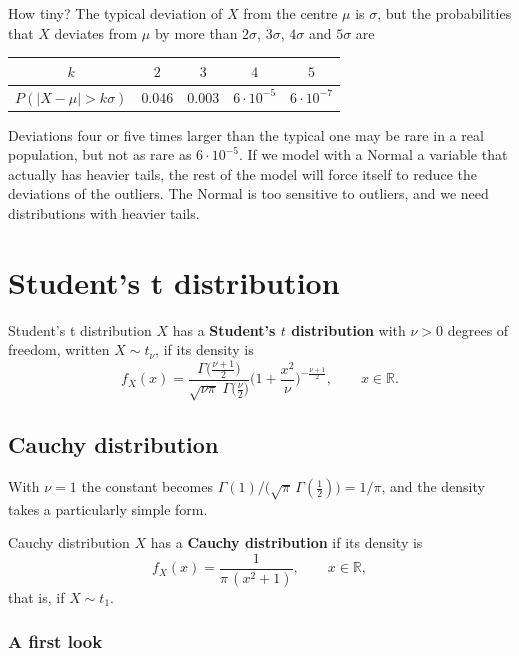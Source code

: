 \documentclass[a4paper,12pt,oneside]{report}
\begin{document}
\begin{studylater}
How tiny? The typical deviation of $X$ from the centre $\mu$ is $\sigma$, but
the probabilities that $X$ deviates from $\mu$ by more than $2\sigma$,
$3\sigma$, $4\sigma$ and $5\sigma$ are
\begin{center}
\begin{tabular}{c|cccc}
$k$ & $2$ & $3$ & $4$ & $5$\\
\hline
$P(|X-\mu|>k\sigma)$ & $0.046$ & $0.003$ & $6\cdot10^{-5}$ & $6\cdot10^{-7}$
\end{tabular}
\end{center}
Deviations four or five times larger than the typical one may be rare in a
real population, but not as rare as $6\cdot10^{-5}$. If we model with a
Normal a variable that actually has heavier tails, the rest of the model
will force itself to reduce the deviations of the outliers. The Normal is
too sensitive to outliers, and we need distributions with heavier tails.
\end{studylater}

\section{Student's t distribution}

\begin{frameddefn}{Student's t distribution}\label{def:student-t}
$X$ has a \textbf{Student's $t$ distribution} with $\nu>0$ degrees of
freedom, written $X\sim t_\nu$, if its density is
\[
f_X(x)=\frac{\Gamma\!\big(\frac{\nu+1}{2}\big)}
{\sqrt{\nu\pi}\;\Gamma\!\big(\frac{\nu}{2}\big)}
\Big(1+\frac{x^2}{\nu}\Big)^{-\frac{\nu+1}{2}},\qquad x\in\mathbb{R}.
\]
\end{frameddefn}

\subsection{Cauchy distribution}

With $\nu=1$ the constant becomes
$\Gamma(1)/\big(\sqrt{\pi}\,\Gamma(\tfrac12)\big)=1/\pi$, and the density
takes a particularly simple form.

\begin{frameddefn}{Cauchy distribution}\label{def:cauchy}
$X$ has a \textbf{Cauchy distribution} if its density is
\[
f_X(x)=\frac{1}{\pi\,(x^2+1)},\qquad x\in\mathbb{R},
\]
that is, if $X\sim t_1$.
\end{frameddefn}

\subsubsection{A first look}\label{sec:cauchy-first-look}
\end{document}
